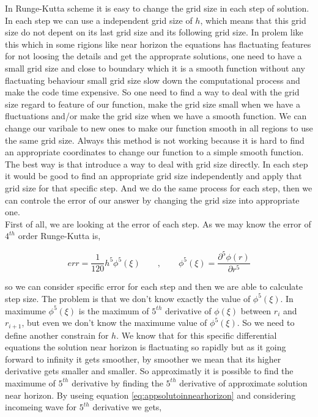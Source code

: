 In Runge-Kutta scheme it is easy to change the grid size in each step of solution. In each step we can use a independent grid size of $h$, which means that this grid size do not depent on its last grid size and its following grid size. In prolem like this which in some rigions like near horizon the equations has flactuating features for not loosing the details and get the approprate solutions, one need to have a small grid size and close to boundary which it is a smooth function without any flactuating behaviour small grid size slow down the computational process and make the code time expensive. So one need to find a way to deal with the grid size regard to feature of our function, make the grid size small when we have a fluctuations and/or make the grid size when we have a smooth function. We can change our varibale to new ones to make our function smooth in all regions to use the same grid size. Always this method is not working because it is hard to find an appropriate coordinates to change our function to a simple smooth function. The best way is that introduce a way to deal with grid size directly. In each step it would be good to find an appropriate grid size independently and apply that grid size for that specific step. And we do the same process for each step, then we can controle the error of our answer by changing the grid size into appropriate one.\\

First of all, we are looking at the error of each step. As we may know the error of $4^{th}$ order Runge-Kutta is,

\begin{equation} \label{eq:RK4err}
    err = \frac{1}{120}h^5\phi^{5}(\xi) \qquad , \qquad \phi^{5}(\xi) = \frac{\partial^5\phi(r)}{\partial r^5}
\end{equation}

so we can consider specific error for each step and then we are able to calculate step size. The problem is that we don't know exactly the value of $\phi^{5}(\xi)$. In maximume $\phi^{5}(\xi)$ is the maximum of $5^{th}$ derivative of $\phi(\xi)$ between $r_{i}$ and $r_{i+1}$, but even we don't know the maximume value of $\phi^{5}(\xi)$. So we need to define another constrain for $h$. We know that for this specific differential equations the solution near horizon is flactuating so rapidly but as it going forward to infinity it gets smoother, by smoother we mean that its higher derivative gets smaller and smaller. So approximatly it is possible to find the maximume of $5^{th}$ derivative by finding the $5^{th}$ derivative of approximate solution near horizon. By useing equation \ref{eq:appsolutoinnearhorizon} and considering incomeing wave for $5^{th}$ derivative we gets,

